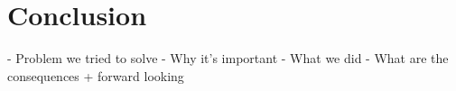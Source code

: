 \chapter{Conclusion}

- Problem we tried to solve
- Why it's important
- What we did
- What are the consequences + forward looking
